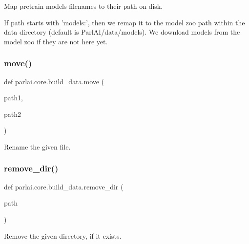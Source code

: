 \begin{DoxyVerb}Map pretrain models filenames to their path on disk.

If path starts with 'models:', then we remap it to the model zoo path within the
data directory (default is ParlAI/data/models). We download models from the model
zoo if they are not here yet.
\end{DoxyVerb}
 \mbox{\label{namespaceparlai_1_1core_1_1build__data_a1678b8a042eeb9d9c8e9de08f52e496b}} 
\subsubsection{\texorpdfstring{move()}{move()}}
{\footnotesize\ttfamily def parlai.\+core.\+build\+\_\+data.\+move (\begin{DoxyParamCaption}\item[{}]{path1,  }\item[{}]{path2 }\end{DoxyParamCaption})}

\begin{DoxyVerb}Rename the given file.
\end{DoxyVerb}
 \mbox{\label{namespaceparlai_1_1core_1_1build__data_a24ab3b7e68e41adf774df058d330ff33}} 
\subsubsection{\texorpdfstring{remove\+\_\+dir()}{remove\_dir()}}
{\footnotesize\ttfamily def parlai.\+core.\+build\+\_\+data.\+remove\+\_\+dir (\begin{DoxyParamCaption}\item[{}]{path }\end{DoxyParamCaption})}

\begin{DoxyVerb}Remove the given directory, if it exists.
\end{DoxyVerb}
 \mbox{\label{namespaceparlai_1_1core_1_1build__data_a4d33f97932682a8513904022d852f3cf}} 
